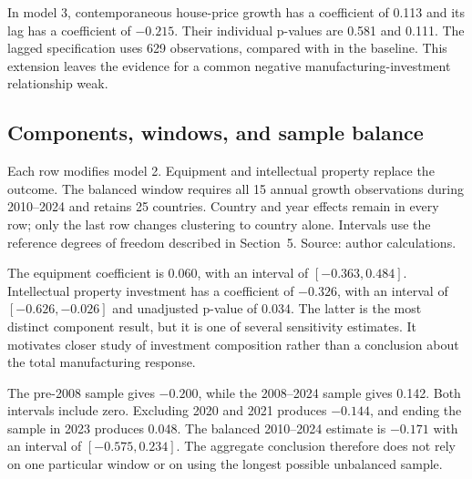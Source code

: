 \documentclass[11pt,letterpaper]{article}
\begin{document}
In model 3, contemporaneous house-price growth has a coefficient of 0.113 and its lag has a coefficient of $-0.215$. Their individual p-values are 0.581 and 0.111. The lagged specification uses 629 observations, compared with \PanelN{} in the baseline. This extension leaves the evidence for a common negative manufacturing-investment relationship weak.

\subsection{Components, windows, and sample balance}
\begin{table}[!htbp]\centering\begin{threeparttable}
\caption{Sensitivity of the EU house-price coefficient}\label{tab:4}
\small{}\setlength{\tabcolsep}{3pt}\renewcommand{\arraystretch}{1.25}

\begin{tablenotes}[flushleft]\footnotesize{}
\item Each row modifies model 2. Equipment and intellectual property replace the outcome. The balanced window requires all 15 annual growth observations during 2010--2024 and retains 25 countries. Country and year effects remain in every row; only the last row changes clustering to country alone. Intervals use the reference degrees of freedom described in Section~5. Source: author calculations.
\end{tablenotes}\end{threeparttable}\end{table}\FloatBarrier

The equipment coefficient is 0.060, with an interval of $[-0.363,0.484]$. Intellectual property investment has a coefficient of $-0.326$, with an interval of $[-0.626,-0.026]$ and unadjusted p-value of 0.034. The latter is the most distinct component result, but it is one of several sensitivity estimates. It motivates closer study of investment composition rather than a conclusion about the total manufacturing response.

The pre-2008 sample gives $-0.200$, while the 2008--2024 sample gives 0.142. Both intervals include zero. Excluding 2020 and 2021 produces $-0.144$, and ending the sample in 2023 produces 0.048. The balanced 2010--2024 estimate is $-0.171$ with an interval of $[-0.575,0.234]$. The aggregate conclusion therefore does not rely on one particular window or on using the longest possible unbalanced sample.
\end{document}
